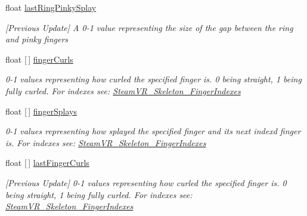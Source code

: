 \begin{DoxyCompactItemize}
float \mbox{\hyperlink{interface_valve_1_1_v_r_1_1_i_steam_v_r___action___skeleton___source_a6bc4fdf659ba4ec2ea8613ecbb10abba}{last\+Ring\+Pinky\+Splay}}
\begin{DoxyCompactList}\small\item\em \mbox{[}Previous Update\mbox{]} A 0-\/1 value representing the size of the gap between the ring and pinky fingers \end{DoxyCompactList}\item 
float \mbox{[}$\,$\mbox{]} \mbox{\hyperlink{interface_valve_1_1_v_r_1_1_i_steam_v_r___action___skeleton___source_aa754453c9e7c84d5be21147f63efea3e}{finger\+Curls}}
\begin{DoxyCompactList}\small\item\em 0-\/1 values representing how curled the specified finger is. 0 being straight, 1 being fully curled. For indexes see\+: \mbox{\hyperlink{class_valve_1_1_v_r_1_1_steam_v_r___skeleton___finger_indexes}{Steam\+V\+R\+\_\+\+Skeleton\+\_\+\+Finger\+Indexes}} \end{DoxyCompactList}\item 
float \mbox{[}$\,$\mbox{]} \mbox{\hyperlink{interface_valve_1_1_v_r_1_1_i_steam_v_r___action___skeleton___source_a4236e5530f9571b5afc65e299344f1c9}{finger\+Splays}}
\begin{DoxyCompactList}\small\item\em 0-\/1 values representing how splayed the specified finger and it\textquotesingle{}s next index\textquotesingle{}d finger is. For indexes see\+: \mbox{\hyperlink{class_valve_1_1_v_r_1_1_steam_v_r___skeleton___finger_indexes}{Steam\+V\+R\+\_\+\+Skeleton\+\_\+\+Finger\+Indexes}} \end{DoxyCompactList}\item 
float \mbox{[}$\,$\mbox{]} \mbox{\hyperlink{interface_valve_1_1_v_r_1_1_i_steam_v_r___action___skeleton___source_adc436c262777fdddc1ac99cc4e921547}{last\+Finger\+Curls}}
\begin{DoxyCompactList}\small\item\em \mbox{[}Previous Update\mbox{]} 0-\/1 values representing how curled the specified finger is. 0 being straight, 1 being fully curled. For indexes see\+: \mbox{\hyperlink{class_valve_1_1_v_r_1_1_steam_v_r___skeleton___finger_indexes}{Steam\+V\+R\+\_\+\+Skeleton\+\_\+\+Finger\+Indexes}} \end{DoxyCompactList}\item 

\end{DoxyCompactItemize}
